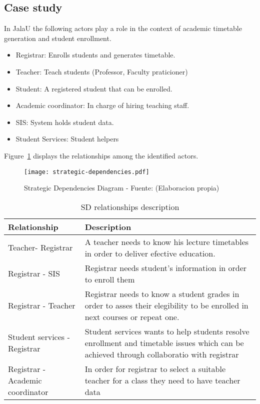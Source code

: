 \subsection{Case study}
In JalaU the following actors play a role in the context of academic timetable generation and student enrollment.
\begin{itemize}
	\item Registrar: Enrolls students and generates timetable.
	\item Teacher: Teach students (Professor, Faculty praticioner)
	\item Student: A registered student that can be enrolled.
	\item Academic coordinator: In charge of hiring teaching staff.
	\item SIS: System holds student data.
	\item Student Services: Student helpers
\end{itemize}

Figure~\ref{fig:strategicDependenciesDiagram} displays the relationships among the identified actors.

\begin{figure}[htb]
	\caption{Strategic Dependencies Diagram - Fuente: (Elaboracion propia)}\label{fig:strategicDependenciesDiagram}
	\begin{center}
		\texttt{[image: strategic-dependencies.pdf]}
	\end{center}
\end{figure}

\begin{table}
	\caption{SD relationships description}\label{tab:strategicDependencies}
	\begin{center}
		\begin{tabularx}{\textwidth}{p{2in}X} \toprule
			\textbf{Relationship} &  \textbf{Description}\\
			\midrule
			
			Teacher- Registrar & A teacher needs to know his lecture timetables in order to deliver efective education. \\
			Registrar - SIS & Registrar needs student's information in order to enroll them\\
			Registrar - Teacher & Registrar needs to know a student grades in order to asses their elegibility to be enrolled in next courses or repeat one. \\
			Student services - Registrar & Student services wants to help students resolve enrollment and timetable issues which can be achieved through collaboratio with registrar \\
			Registrar - Academic coordinator & In order for registrar to select a suitable teacher for a class they need to have teacher data\\
			\bottomrule
		\end{tabularx}
	\end{center}
\end{table}

